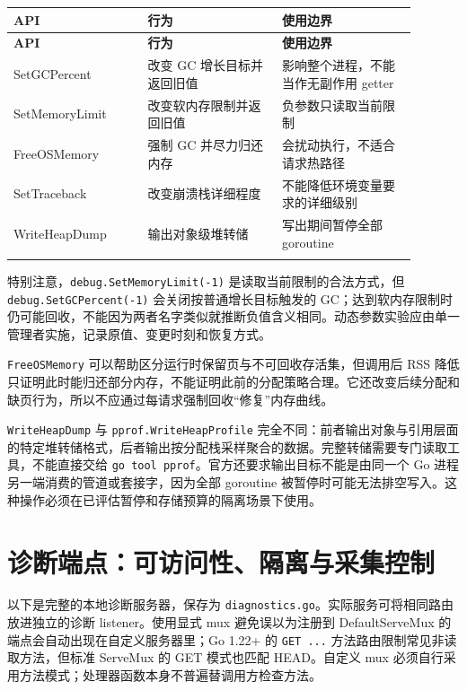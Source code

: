 \documentclass[UTF8,fontset=fandol,openany,11pt]{ctexbook}
\begin{document}
\begingroup\small\setlength{\tabcolsep}{4pt}
\begin{longtable}{>{\raggedright\arraybackslash}p{0.298\linewidth}>{\raggedright\arraybackslash}p{0.298\linewidth}>{\raggedright\arraybackslash}p{0.298\linewidth}}
\toprule
\textbf{API} & \textbf{行为} & \textbf{使用边界} \\
\midrule
\endfirsthead
\toprule
\textbf{API} & \textbf{行为} & \textbf{使用边界} \\
\midrule
\endhead
SetGCPercent & 改变 GC 增长目标并返回旧值 & 影响整个进程，不能当作无副作用 getter \\
\addlinespace[3pt]
SetMemoryLimit & 改变软内存限制并返回旧值 & 负参数只读取当前限制 \\
\addlinespace[3pt]
FreeOSMemory & 强制 GC 并尽力归还内存 & 会扰动执行，不适合请求热路径 \\
\addlinespace[3pt]
SetTraceback & 改变崩溃栈详细程度 & 不能降低环境变量要求的详细级别 \\
\addlinespace[3pt]
WriteHeapDump & 输出对象级堆转储 & 写出期间暂停全部 goroutine \\
\addlinespace[3pt]
\bottomrule
\end{longtable}
\endgroup
特别注意，\texttt{debug.\allowbreak{}SetMemoryL\allowbreak{}imit(-\allowbreak{}1)} 是读取当前限制的合法方式，但 \texttt{debug.\allowbreak{}SetGCPercent(-\allowbreak{}1)} 会关闭按普通增长目标触发的 GC；达到软内存限制时仍可能回收，不能因为两者名字类似就推断负值含义相同。动态参数实验应由单一管理者实施，记录原值、变更时刻和恢复方式。

\texttt{FreeOSMemory} 可以帮助区分运行时保留页与不可回收存活集，但调用后 RSS 降低只证明此时能归还部分内存，不能证明此前的分配策略合理。它还改变后续分配和缺页行为，所以不应通过每请求强制回收“修复”内存曲线。

\texttt{WriteHeapD\allowbreak{}ump} 与 \texttt{pprof.\allowbreak{}WriteHeapP\allowbreak{}rofile} 完全不同：前者输出对象与引用层面的特定堆转储格式，后者输出按分配栈采样聚合的数据。完整转储需要专门读取工具，不能直接交给 \texttt{go tool pprof}。官方还要求输出目标不能是由同一个 Go 进程另一端消费的管道或套接字，因为全部 goroutine 被暂停时可能无法排空写入。这种操作必须在已评估暂停和存储预算的隔离场景下使用。

\section{诊断端点：可访问性、隔离与采集控制}
以下是完整的本地诊断服务器，保存为 \texttt{diagnostics.\allowbreak{}go}。实际服务可将相同路由放进独立的诊断 listener。使用显式 mux 避免误以为注册到 DefaultServeMux 的端点会自动出现在自定义服务器里；Go 1.22+ 的 \texttt{GET .\allowbreak{}.\allowbreak{}.\allowbreak{}} 方法路由限制常见非读取方法，但标准 ServeMux 的 GET 模式也匹配 HEAD。自定义 mux 必须自行采用方法模式；处理器函数本身不普遍替调用方检查方法。
\end{document}
